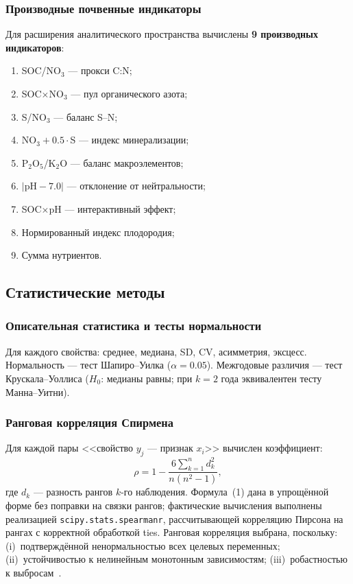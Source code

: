 \subsubsection{Производные почвенные индикаторы}
\label{sec:derived_indicators}

Для расширения аналитического пространства вычислены \textbf{9 производных индикаторов}:
\begin{enumerate}[nosep]
  \item SOC/NO$_3$ --- прокси C:N;
  \item SOC$\times$NO$_3$ --- пул органического азота;
  \item S/NO$_3$ --- баланс S--N;
  \item NO$_3 + 0.5\cdot$S --- индекс минерализации;
  \item P$_2$O$_5$/K$_2$O --- баланс макроэлементов;
  \item $|\text{pH} - 7.0|$ --- отклонение от нейтральности;
  \item SOC$\times$pH --- интерактивный эффект;
  \item Нормированный индекс плодородия;
  \item Сумма нутриентов.
\end{enumerate}

\subsection{Статистические методы}
\label{sec:stat_methods}

\subsubsection{Описательная статистика и тесты нормальности}

Для каждого свойства: среднее, медиана, SD, CV, асимметрия, эксцесс. Нормальность --- тест Шапиро--Уилка ($\alpha = 0.05$). Межгодовые различия --- тест Крускала--Уоллиса ($H_0$: медианы равны; при $k = 2$ года эквивалентен тесту Манна--Уитни).

\subsubsection{Ранговая корреляция Спирмена}
\label{sec:spearman}

Для каждой пары <<свойство $y_j$ --- признак $x_i$>> вычислен коэффициент:
\begin{equation}
\rho = 1 - \frac{6\sum_{k=1}^{n} d_k^2}{n(n^2 - 1)},
\end{equation}
где $d_k$ --- разность рангов $k$-го наблюдения. Формула~(1) дана в упрощённой форме без поправки на связки рангов; фактические вычисления выполнены реализацией \texttt{scipy.stats.spearmanr}, рассчитывающей корреляцию Пирсона на рангах с корректной обработкой ties. Ранговая корреляция выбрана, поскольку: (i)~подтверждённой ненормальностью всех целевых переменных; (ii)~устойчивостью к нелинейным монотонным зависимостям; (iii)~робастностью к выбросам~\citep{ViscarraRossel2006}.

